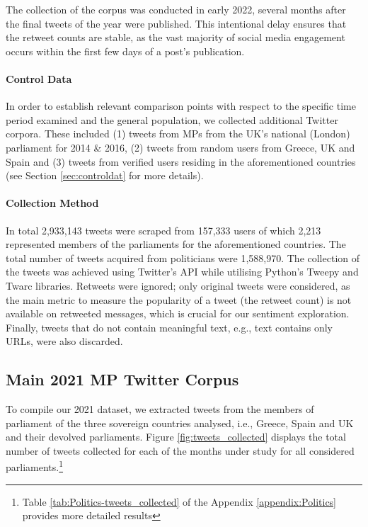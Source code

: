 The collection of the corpus was conducted in early 2022, several months after the final tweets of the year were published. This intentional delay ensures that the retweet counts are stable, as the vast majority of social media engagement occurs within the first few days of a post's publication.

\paragraph{Control Data} In order to establish relevant comparison points with respect to the specific time period examined and the general population, we collected additional Twitter corpora. These included (1) tweets from \acp{MP} from the UK's national (London) parliament for 2014 \& 2016, (2) tweets from random users from Greece, UK and Spain and (3) tweets from verified users residing in the aforementioned countries (see Section \ref{sec:controldat} for more details).

\paragraph{Collection Method} In total 2,933,143 tweets were scraped from 157,333 users of which 2,213 represented members of the parliaments for the aforementioned countries. The total number of tweets acquired from politicians were 1,588,970. The collection of the tweets was achieved using Twitter's \ac{API} while utilising Python's Tweepy \cite{roesslein2009tweepy} and Twarc \cite{twarc} libraries. Retweets were ignored; only original tweets were considered, as the main metric to measure the popularity of a tweet (the retweet count) is not available on retweeted messages, which is crucial for our sentiment exploration. Finally, tweets that do not contain  meaningful text, e.g., text contains only URLs, were also discarded.

\subsection{Main 2021 MP Twitter Corpus}
\label{maindataset}

To compile our 2021 dataset, we extracted tweets from the members of parliament of the three sovereign countries analysed, i.e., Greece, Spain and UK and their devolved parliaments. Figure \ref{fig:tweets_collected} displays the total number of tweets collected for each of the months under study for all considered parliaments.\footnote{Table \ref{tab:Politics-tweets_collected} of the Appendix \ref{appendix:Politics} provides more detailed results}


